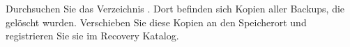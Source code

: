    \item Durchsuchen Sie das Verzeichnis . Dort befinden sich Kopien aller Backups, die gelöscht wurden. Verschieben Sie diese Kopien an den Speicherort  und registrieren Sie sie im Recovery Katalog.

